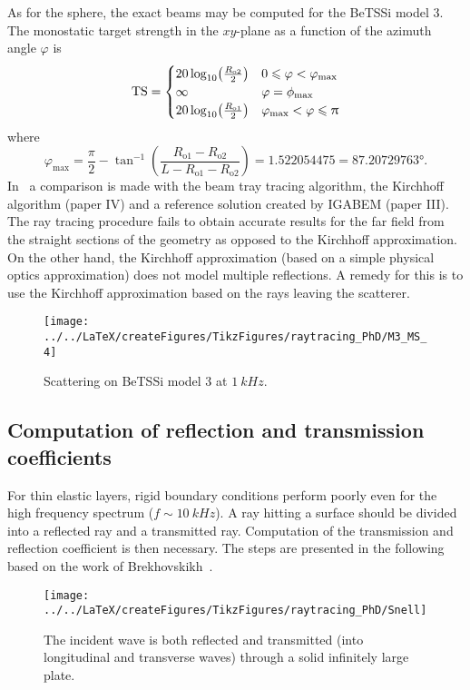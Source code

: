 As for the sphere, the exact beams may be computed for the BeTSSi model 3. The monostatic target strength in the $xy$-plane as a function of the azimuth angle $\varphi$ is 
\begin{equation*}
	\TS = \begin{cases}
		 20\log_{10}\left(\frac{R_{\mathrm{o}2}}{2}\right) & 0\leq\varphi<\varphi_{\mathrm{max}}\\
		 \infty & \varphi = \phi_{\mathrm{max}}\\
		 20\log_{10}\left(\frac{R_{\mathrm{o}1}}{2}\right) & \varphi_{\mathrm{max}}<\varphi\leq\PI
	\end{cases}
\end{equation*}
where~\cite[p. 108]{Venas2015iao}
\begin{equation*}
	\varphi_{\mathrm{max}} = \frac{\pi}{2}-\tan^{-1}\left(\frac{R_{\mathrm{o}1}-R_{\mathrm{o}2}}{L-R_{\mathrm{o}1}-R_{\mathrm{o}2}}\right) = 1.522054475 = \ang{87.20729763}.
\end{equation*}
In~ a comparison is made with the beam tray tracing algorithm, the Kirchhoff algorithm (paper IV) and a reference solution created by IGABEM (paper III). The ray tracing procedure fails to obtain accurate results for the far field from the straight sections of the geometry as opposed to the Kirchhoff approximation. On the other hand, the Kirchhoff approximation (based on a simple physical optics approximation) does not model multiple reflections. A remedy for this is to use the Kirchhoff approximation based on the rays leaving the scatterer.
\begin{figure}
	\centering
	\texttt{[image: ../../LaTeX/createFigures/TikzFigures/raytracing\_PhD/M3\_MS\_4]}
	\caption{Scattering on BeTSSi model 3 at $\SI{1}{kHz}$.}
	\label{Fig:M3_MS}
\end{figure}

\subsection{Computation of reflection and transmission coefficients}
For thin elastic layers, rigid boundary conditions perform poorly even for the high frequency spectrum ($f \sim \SI{10}{kHz}$). A ray hitting a surface should be divided into a reflected ray and a transmitted ray. Computation of the transmission and reflection coefficient is then necessary. The steps are presented in the following based on the work of Brekhovskikh~\cite{Brekhovskikh2012wil}.
\begin{figure}
	\centering
	\texttt{[image: ../../LaTeX/createFigures/TikzFigures/raytracing\_PhD/Snell]}
	\caption{The incident wave is both reflected and transmitted (into longitudinal and transverse waves) through a solid infinitely large plate.}
\end{figure}

